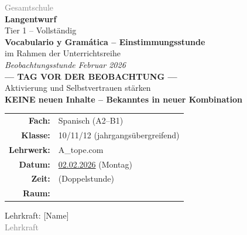 \documentclass[11pt,a4paper]{article}
\newcommand{\fach}{Spanisch}
\newcommand{\jahrgangsstufe}{10/11/12 (jahrgangsübergreifend)}
\newcommand{\schulart}{Gesamtschule}
\newcommand{\stundenthema}{Vocabulario y Gramática -- Einstimmungsstunde}
\newcommand{\reihenthema}{Beobachtungsstunde Februar 2026}
\newcommand{\unterrichtsdatum}{02.02.2026}
\newcommand{\lehrkraft}{[Name]}
\newcommand{\ausbildungsstand}{Lehrkraft}
\newcommand{\gerniveau}{A2--B1}
\newcommand{\lehrwerk}{A\_tope.com}
\begin{document}
\begin{titlepage}
    \centering
    \vspace*{2cm}

    {\large\textcolor{gray}{\schulart}}\\[2cm]

    {\Huge\textcolor{fach}{\textbf{Langentwurf}}}\\[0.5cm]
    {\large Tier 1 -- Vollständig}\\[2cm]

    {\LARGE\textbf{\stundenthema}}\\[0.5cm]
    {\large im Rahmen der Unterrichtsreihe}\\[0.3cm]
    {\Large\textit{\reihenthema}}\\[1cm]

    \textcolor{overlap}{\Large\textbf{--- TAG VOR DER BEOBACHTUNG ---}}\\[0.3cm]
    {\normalsize Aktivierung und Selbstvertrauen stärken}\\[0.3cm]
    {\normalsize \textbf{KEINE neuen Inhalte -- Bekanntes in neuer Kombination}}\\[1.5cm]

    \begin{tabular}{rl}
        \textbf{Fach:} & \fach{} (\gerniveau) \\[0.3cm]
        \textbf{Klasse:} & \jahrgangsstufe \\[0.3cm]
        \textbf{Lehrwerk:} & \lehrwerk \\[0.3cm]
        \textbf{Datum:} & \underline{\hspace{1cm}\unterrichtsdatum\hspace{1cm}} (Montag) \\[0.3cm]
        \textbf{Zeit:} & \underline{\hspace{3cm}} (Doppelstunde) \\[0.3cm]
        \textbf{Raum:} & \underline{\hspace{3cm}} \\[0.3cm]
    \end{tabular}

    \vfill

    {\large Lehrkraft: \lehrkraft}\\[0.3cm]
    {\normalsize\textcolor{gray}{\ausbildungsstand}}\\[1cm]

\end{titlepage}
\end{document}
